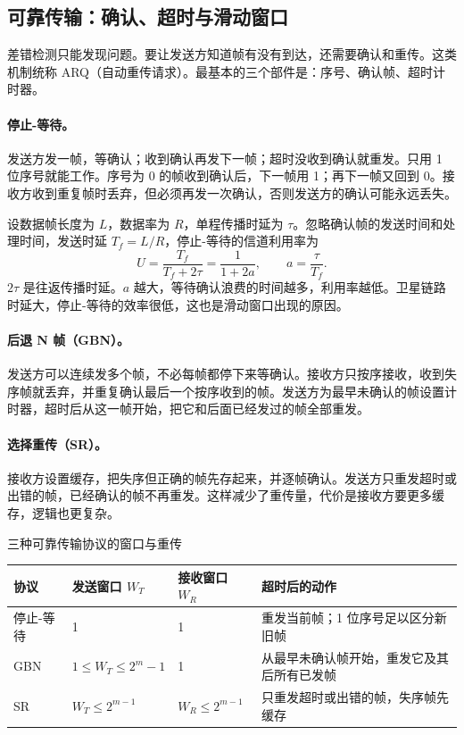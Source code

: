 \subsection{可靠传输：确认、超时与滑动窗口}

差错检测只能发现问题。要让发送方知道帧有没有到达，还需要确认和重传。这类机制统称 ARQ（自动重传请求）。最基本的三个部件是：序号、确认帧、超时计时器。

\paragraph{停止-等待。}发送方发一帧，等确认；收到确认再发下一帧；超时没收到确认就重发。只用 1 位序号就能工作。序号为 0 的帧收到确认后，下一帧用 1；再下一帧又回到 0。接收方收到重复帧时丢弃，但必须再发一次确认，否则发送方的确认可能永远丢失。

设数据帧长度为 $L$，数据率为 $R$，单程传播时延为 $\tau$。忽略确认帧的发送时间和处理时间，发送时延 $T_f=L/R$，停止-等待的信道利用率为
\[
U=\frac{T_f}{T_f+2\tau}=\frac{1}{1+2a},\qquad a=\frac{\tau}{T_f}.
\]
$2\tau$ 是往返传播时延。$a$ 越大，等待确认浪费的时间越多，利用率越低。卫星链路时延大，停止-等待的效率很低，这也是滑动窗口出现的原因。

\paragraph{后退 N 帧（GBN）。}发送方可以连续发多个帧，不必每帧都停下来等确认。接收方只按序接收，收到失序帧就丢弃，并重复确认最后一个按序收到的帧。发送方为最早未确认的帧设置计时器，超时后从这一帧开始，把它和后面已经发过的帧全部重发。

\paragraph{选择重传（SR）。}接收方设置缓存，把失序但正确的帧先存起来，并逐帧确认。发送方只重发超时或出错的帧，已经确认的帧不再重发。这样减少了重传量，代价是接收方要更多缓存，逻辑也更复杂。

\begin{tablebox}{三种可靠传输协议的窗口与重传}
\centering
\small
\begin{tabularx}{\linewidth}{|p{2.2cm}|p{3.2cm}|p{2.5cm}|X|}
\hline
协议 & 发送窗口 $W_T$ & 接收窗口 $W_R$ & 超时后的动作 \\
\hline
停止-等待 & 1 & 1 & 重发当前帧；1 位序号足以区分新旧帧 \\
GBN & $1\le W_T\le 2^m-1$ & 1 & 从最早未确认帧开始，重发它及其后所有已发帧 \\
SR & $W_T\le 2^{m-1}$ & $W_R\le 2^{m-1}$ & 只重发超时或出错的帧，失序帧先缓存 \\
\hline
\end{tabularx}
\end{tablebox}

